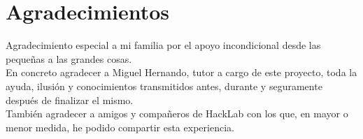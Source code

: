 \chapter{Agradecimientos} \label{chap:Agradecimientos}


Agradecimiento especial a mi familia por el apoyo incondicional desde las pequeñas a las grandes cosas.
\\

En concreto agradecer a Miguel Hernando, tutor a cargo de este proyecto, toda la ayuda, ilusión y conocimientos transmitidos antes, durante y seguramente después de finalizar el mismo.
\\

También agradecer a amigos y compañeros de HackLab con los que, en mayor o menor medida, he podido compartir esta experiencia.